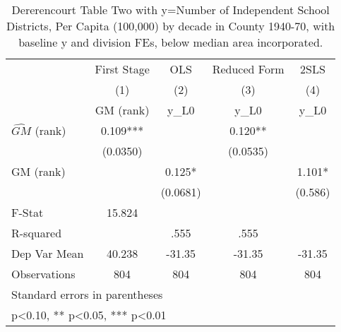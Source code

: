 \begin{table}[htbp]\centering
\def\sym#1{\ifmmode^{#1}\else\(^{#1}\)\fi}
\caption{Dererencourt Table Two with y=Number of Independent School Districts, Per Capita (100,000) by decade in County 1940-70, with baseline y and division FEs, below median area incorporated.}
\begin{tabular}{l*{4}{c}}
\toprule
                    & First Stage   &         OLS   &Reduced Form   &        2SLS   \\
                    &\multicolumn{1}{c}{(1)}&\multicolumn{1}{c}{(2)}&\multicolumn{1}{c}{(3)}&\multicolumn{1}{c}{(4)}\\
                    &\multicolumn{1}{c}{GM  (rank)}&\multicolumn{1}{c}{y\_L0}&\multicolumn{1}{c}{y\_L0}&\multicolumn{1}{c}{y\_L0}\\
\midrule
$\hat{GM}$ (rank)   &       0.109***&               &       0.120** &               \\
                    &    (0.0350)   &               &    (0.0535)   &               \\
\addlinespace
GM  (rank)          &               &       0.125*  &               &       1.101*  \\
                    &               &    (0.0681)   &               &     (0.586)   \\
\midrule
F-Stat              &      15.824   &               &               &               \\
R-squared           &               &        .555   &        .555   &               \\
Dep Var Mean        &      40.238   &      -31.35   &      -31.35   &      -31.35   \\
Observations        &         804   &         804   &         804   &         804   \\
\bottomrule
\multicolumn{5}{l}{\footnotesize Standard errors in parentheses}\\
\multicolumn{5}{l}{\footnotesize * p<0.10, ** p<0.05, *** p<0.01}\\
\end{tabular}
\end{table}
